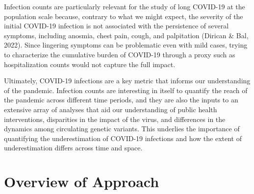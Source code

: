 \documentclass[12pt,twoside]{smiththesis}
\begin{document}
Infection counts are particularly relevant for the study of long COVID-19 at the population scale because, contrary to what we might expect, the severity of the initial COVID-19 infection is not associated with the persistence of several symptoms, including anosmia, chest pain, cough, and palpitation (Dirican \& Bal, 2022). Since lingering symptoms can be problematic even with mild cases, trying to characterize the cumulative burden of COVID-19 through a proxy such as hospitalization counts would not capture the full impact.

Ultimately, COVID-19 infections are a key metric that informs our understanding of the pandemic. Infection counts are interesting in itself to quantify the reach of the pandemic across different time periods, and they are also the inputs to an extensive array of analyses that aid our understanding of public health interventions, disparities in the impact of the virus, and differences in the dynamics among circulating genetic variants. This underlies the importance of quantifying the underestimation of COVID-19 infections and how the extent of underestimation differs across time and space.

\hypertarget{overview}{%
\chapter{Overview of Approach}\label{overview}}
\end{document}
